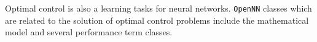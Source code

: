 Optimal control is also a learning tasks for neural networks. 
\texttt{OpenNN} classes which are related to the solution of optimal control problems include the mathematical model and  
several performance term classes. 

